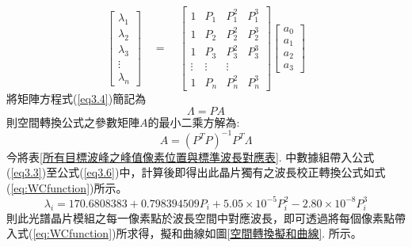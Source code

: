 \begin{equation}\label{eq3.4}
	\begin{bmatrix} \lambda_1\\\lambda_2\\\lambda_3\\ \vdots\\\lambda_n\end{bmatrix} 
	\quad
	= 
	\quad
	\begin{bmatrix} 
		1&P_1&P_{1}^{2}&P_{1}^{3}\\
		1&P_2&P_{2}^{2}&P_{2}^{3}\\
		1&P_3&P_{3}^{2}&P_{3}^{3}\\
		\vdots&\vdots&\vdots\\
		1&P_n&P_{n}^{2}&P_{n}^{3}
	\end{bmatrix}
	\begin{bmatrix} a_0\\a_1\\a_2\\a_3 \end{bmatrix} 
\end{equation}
將矩陣方程式(\ref{eq3.4})簡記為
\begin{equation}\label{eq3.5}
	\Lambda = PA
\end{equation}
則空間轉換公式之參數矩陣$A$的最小二乘方解為:
\begin{equation}\label{eq3.6}
	A = (P^TP)^{-1}P^T \Lambda
\end{equation}
今將表\ref{所有目標波峰之峰值像素位置與標準波長對應表}. 中數據組帶入公式(\ref{eq3.3})至公式(\ref{eq3.6})中，計算後即得出此晶片獨有之波長校正轉換公式如式(\ref{eq:WCfunction})所示。
\begin{equation}\label{eq:WCfunction}
	\lambda_i = 170.6808383 + 0.798394509P_i + 5.05 \times 10^{-5}P_i^2 -2.80\times 10^{-8}P_i^3	
\end{equation}
則此光譜晶片模組之每一像素點於波長空間中對應波長，即可透過將每個像素點帶入式(\ref{eq:WCfunction})所求得，擬和曲線如圖\ref{空間轉換擬和曲線}. 所示。
